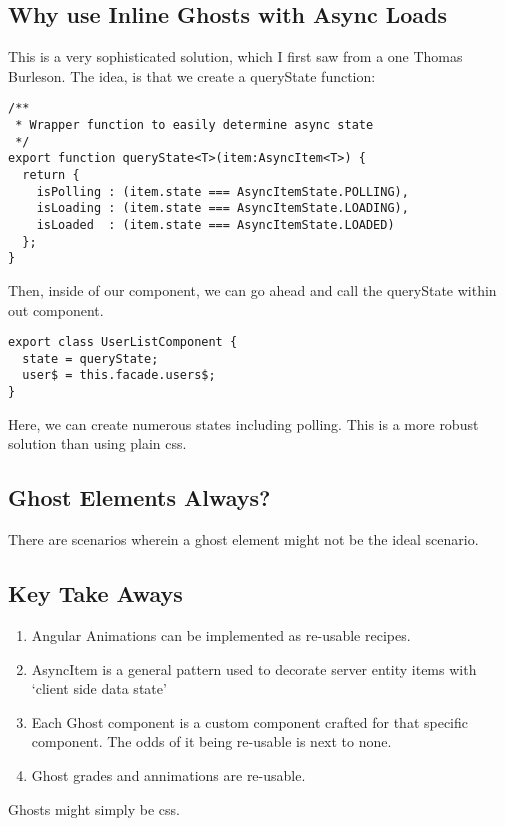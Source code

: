 \subsection{ Why use Inline Ghosts with Async Loads}
This is a very sophisticated solution, which I first saw from a one Thomas
Burleson. The idea, is that we create a queryState function:
\begin{lstlisting}
/**
 * Wrapper function to easily determine async state
 */
export function queryState<T>(item:AsyncItem<T>) {
  return {
    isPolling : (item.state === AsyncItemState.POLLING),
    isLoading : (item.state === AsyncItemState.LOADING),
    isLoaded  : (item.state === AsyncItemState.LOADED)
  };
}
\end{lstlisting}

Then, inside of our component, we can go ahead and call the queryState within
out component.

\begin{lstlisting}
export class UserListComponent {
  state = queryState;
  user$ = this.facade.users$;
}
\end{lstlisting}

Here, we can create numerous states including polling. This is a more robust
solution than using plain css.

\subsection{ Ghost Elements Always? }
There are scenarios wherein a ghost element might not be the ideal scenario.

\subsection{Key Take Aways}
\begin{enumerate}
  \item Angular Animations can be implemented as re-usable recipes.
  \item AsyncItem is a general pattern used to decorate server entity items with
  `client side data state'
  \item Each Ghost component is a custom component crafted for that specific
  component. The odds of it being re-usable is next to none.
  \item Ghost grades and annimations are re-usable.
\end{enumerate}

Ghosts might simply be css. 
